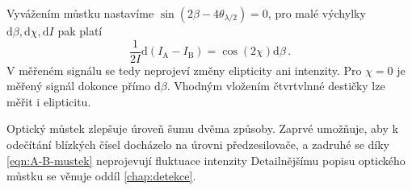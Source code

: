 Vyvážením můstku nastavíme $\sin(2\beta-4\theta_{\lambda/2})=0$, pro malé výchylky $\textrm{d}\beta, \textrm{d}\chi, \textrm{d}I$ pak platí
\begin{equation}
\label{eqn:A-B-mustek}
    \frac{1}{2I}\textrm{d}(I_\textrm{A}-I_\textrm{B})=\cos(2\chi) \textrm{d}\beta \,.
\end{equation}
V měřeném signálu se tedy neprojeví změny elipticity ani intenzity.
Pro $\chi=0$ je měřený signál dokonce přímo $\textrm{d}\beta$.
Vhodným vložením čtvrtvlnné destičky lze měřit i elipticitu\cite{silberQuadraticMagnetoopticKerr2019a}.

Optický můstek zlepšuje úroveň šumu dvěma způsoby.
Zaprvé umožňuje, aby k odečítání blízkých čísel docházelo na úrovni předzesilovače, a zadruhé se díky \eqref{eqn:A-B-mustek} neprojevují fluktuace intenzity
Detailnějšímu popisu optického můstku se věnuje oddíl \ref{chap:detekce}.

